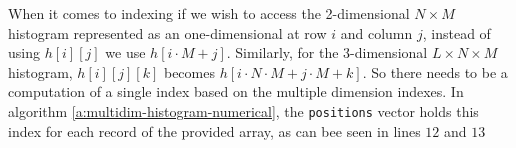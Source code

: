 When it comes to indexing if we wish to access the 2-dimensional $N \times M$ histogram represented as an one-dimensional at row $ i $ and column $ j $, instead of using $h[i][j]$ we use $h[i \cdot M + j]$.
Similarly, for the 3-dimensional $L \times N \times M$ histogram, $h[i][j][k]$ becomes $h[i \cdot N \cdot M + j \cdot M + k]$. So there needs to be a computation of a single index based on the multiple dimension indexes. In algorithm \ref{a:multidim-histogram-numerical}, the \texttt{positions} vector holds this index for each record of the provided array, as can bee seen in lines $ 12 $ and $ 13 $



